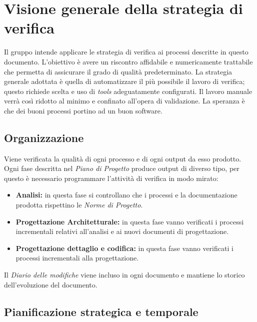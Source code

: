 \clearpage
\section{Visione generale della strategia di verifica}
Il gruppo intende applicare le strategia di verifica ai processi descritte in questo documento. L'obiettivo è avere un riscontro affidabile e numericamente trattabile che permetta di assicurare il grado di qualità predeterminato. La strategia generale adottata è quella di automatizzare il più possibile il lavoro di verifica; questo richiede scelta e uso di \emph{tools} adeguatamente configurati. Il lavoro manuale verrà così ridotto al minimo e confinato all'opera di validazione.
La speranza è che dei buoni processi portino ad un buon software.
	
	\subsection{Organizzazione}
	Viene verificata la qualità di ogni processo e di ogni output da esso prodotto. Ogni fase  descritta nel \emph{Piano di Progetto} produce output di diverso tipo, per questo è necessario programmare l'attività di verifica in modo mirato:

	\begin{itemize}
		\item \textbf{Analisi:} in questa fase si controllano che i processi e la documentazione prodotta rispettino le \emph{Norme di Progetto}.
		\item \textbf{Progettazione Architetturale:} in questa fase vanno verificati i processi incrementali relativi all'analisi e ai nuovi documenti di progettazione.
		\item \textbf{Progettazione dettaglio e codifica:} in questa fase vanno verificati i processi incrementali alla progettazione.
	\end{itemize}
	
	Il \emph{Diario delle modifiche} viene incluso in ogni documento e mantiene lo storico dell'evoluzione del documento.
	
	\subsection{Pianificazione strategica e temporale}
